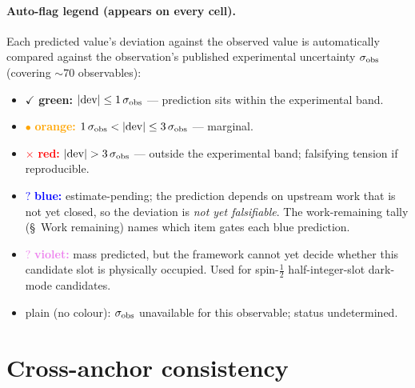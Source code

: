 \documentclass[reprint,amsmath,amssymb,aps,prd,longbibliography,floatfix]{revtex4-2}
\begin{document}
\paragraph{Auto-flag legend (appears on every cell).} Each predicted
value's deviation against the observed value is automatically
compared against the observation's published experimental
uncertainty $\sigma_{\rm obs}$ (covering $\sim 70$ observables):
\begin{itemize}\itemsep0pt
\item \textcolor{OliveGreen}{$\checkmark$ \textbf{green:}}
$|{\rm dev}| \leq 1\,\sigma_{\rm obs}$ --- prediction sits within
the experimental band.
\item \textcolor{orange}{$\bullet$ \textbf{orange:}}
$1\,\sigma_{\rm obs} < |{\rm dev}| \leq 3\,\sigma_{\rm obs}$ ---
marginal.
\item \textcolor{red}{$\times$ \textbf{red:}}
$|{\rm dev}| > 3\,\sigma_{\rm obs}$ --- outside the experimental
band; falsifying tension if reproducible.
\item \textcolor{blue}{$?$ \textbf{blue:}} estimate-pending; the
prediction depends on upstream work that is not yet closed, so
the deviation is \emph{not yet falsifiable}. The work-remaining
tally (\S~Work remaining) names which item gates each blue
prediction.
\item \textcolor{violet}{$?$ \textbf{violet:}} mass predicted, but
the framework cannot yet decide whether this candidate slot is
physically occupied. Used for spin-$\tfrac12$ half-integer-slot
dark-mode candidates.
\item plain (no colour): $\sigma_{\rm obs}$ unavailable for this
observable; status undetermined.
\end{itemize}

\section{Cross-anchor consistency}

%
\end{document}

